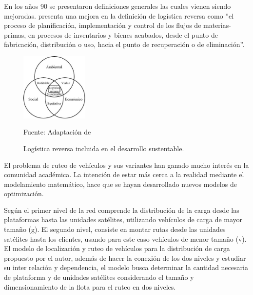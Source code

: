 \documentclass[a4paper, 12pt]{article}
\begin{document}
En los años 90 se presentaron definiciones generales las cuales vienen siendo mejoradas. \cite{Dekker} presenta una mejora en la definición de logística reversa como  ”el proceso de planificación, implementación y control de los flujos de materias-primas, en procesos de inventarios y bienes acabados, desde el punto de fabricación, distribución o uso, hacia el punto de recuperación o de eliminación”. 


\begin{figure}[ht]
\begin{center}
\includegraphics[width=0.3\textwidth]{Figura1}
\end{center}
\begin{center}
\vskip -0.5cm
\caption{\small{Logística reversa incluida en el desarrollo sustentable.}}
{\small{Fuente: Adaptación de \cite{Tanguay}}}
\end{center}
\end{figure}



\vskip 0.4cm
El problema de ruteo de vehículos \citep{Ombuki, Yeun} y sus variantes han ganado mucho interés en la comunidad académica. La intención de estar más cerca a la realidad mediante el modelamiento matemático, hace que se hayan desarrollado nuevos modelos de optimización. \par
\vskip 0.4cm
Según \cite{Sterle} el primer nivel de la red comprende la distribución de la carga desde las plataformas hasta las unidades satélites, utilizando vehículos de carga de mayor tamaño (g).  El segundo nivel, consiste en montar rutas desde las unidades satélites hasta los clientes, usando para este caso vehículos de menor tamaño (v). El modelo de localización y ruteo de vehículos para la distribución de carga propuesto por el autor, además de hacer la conexión de los dos niveles y estudiar su inter relación y dependencia, el modelo busca determinar la cantidad necesaria de plataforma y de unidades satélites considerando el tamaño y dimensionamiento de la flota para el ruteo en dos niveles. 
\vskip 0.2cm
\end{document}
